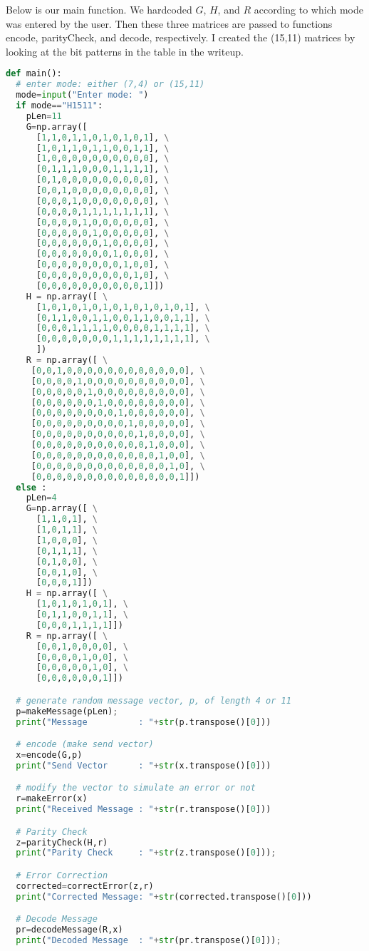 \documentclass[12pt]{article}
\begin{document}
\newpage
\noindent Below is our main function. We hardcoded $G$, $H$, and $R$ according to 
which mode was entered by the user. Then these three matrices are passed to functions 
encode, parityCheck, and decode, respectively. I created the (15,11) matrices by 
looking at the bit patterns in the table in the writeup.
\begin{lstlisting}[frame=single,language=Python,caption=main \label{code:makeMessage}]
def main():
  # enter mode: either (7,4) or (15,11)
  mode=input("Enter mode: ")
  if mode=="H1511": 
    pLen=11
    G=np.array([
      [1,1,0,1,1,0,1,0,1,0,1], \
      [1,0,1,1,0,1,1,0,0,1,1], \
      [1,0,0,0,0,0,0,0,0,0,0], \
      [0,1,1,1,0,0,0,1,1,1,1], \
      [0,1,0,0,0,0,0,0,0,0,0], \
      [0,0,1,0,0,0,0,0,0,0,0], \
      [0,0,0,1,0,0,0,0,0,0,0], \
      [0,0,0,0,1,1,1,1,1,1,1], \
      [0,0,0,0,1,0,0,0,0,0,0], \
      [0,0,0,0,0,1,0,0,0,0,0], \
      [0,0,0,0,0,0,1,0,0,0,0], \
      [0,0,0,0,0,0,0,1,0,0,0], \
      [0,0,0,0,0,0,0,0,1,0,0], \
      [0,0,0,0,0,0,0,0,0,1,0], \
      [0,0,0,0,0,0,0,0,0,0,1]])
    H = np.array([ \
      [1,0,1,0,1,0,1,0,1,0,1,0,1,0,1], \
      [0,1,1,0,0,1,1,0,0,1,1,0,0,1,1], \
      [0,0,0,1,1,1,1,0,0,0,0,1,1,1,1], \
      [0,0,0,0,0,0,0,1,1,1,1,1,1,1,1], \
      ])
    R = np.array([ \
     [0,0,1,0,0,0,0,0,0,0,0,0,0,0,0], \
     [0,0,0,0,1,0,0,0,0,0,0,0,0,0,0], \
     [0,0,0,0,0,1,0,0,0,0,0,0,0,0,0], \
     [0,0,0,0,0,0,1,0,0,0,0,0,0,0,0], \
     [0,0,0,0,0,0,0,0,1,0,0,0,0,0,0], \
     [0,0,0,0,0,0,0,0,0,1,0,0,0,0,0], \
     [0,0,0,0,0,0,0,0,0,0,1,0,0,0,0], \
     [0,0,0,0,0,0,0,0,0,0,0,1,0,0,0], \
     [0,0,0,0,0,0,0,0,0,0,0,0,1,0,0], \
     [0,0,0,0,0,0,0,0,0,0,0,0,0,1,0], \
     [0,0,0,0,0,0,0,0,0,0,0,0,0,0,1]])
  else : 
    pLen=4
    G=np.array([ \
      [1,1,0,1], \
      [1,0,1,1], \
      [1,0,0,0], \
      [0,1,1,1], \
      [0,1,0,0], \
      [0,0,1,0], \
      [0,0,0,1]])
    H = np.array([ \
      [1,0,1,0,1,0,1], \
      [0,1,1,0,0,1,1], \
      [0,0,0,1,1,1,1]])
    R = np.array([ \
      [0,0,1,0,0,0,0], \
      [0,0,0,0,1,0,0], \
      [0,0,0,0,0,1,0], \
      [0,0,0,0,0,0,1]])

  # generate random message vector, p, of length 4 or 11 
  p=makeMessage(pLen);
  print("Message          : "+str(p.transpose()[0]))

  # encode (make send vector)
  x=encode(G,p)
  print("Send Vector      : "+str(x.transpose()[0]))

  # modify the vector to simulate an error or not
  r=makeError(x)
  print("Received Message : "+str(r.transpose()[0]))

  # Parity Check
  z=parityCheck(H,r)
  print("Parity Check     : "+str(z.transpose()[0]));

  # Error Correction
  corrected=correctError(z,r)
  print("Corrected Message: "+str(corrected.transpose()[0]))

  # Decode Message 
  pr=decodeMessage(R,x)
  print("Decoded Message  : "+str(pr.transpose()[0]));
\end{lstlisting}
\end{document}
